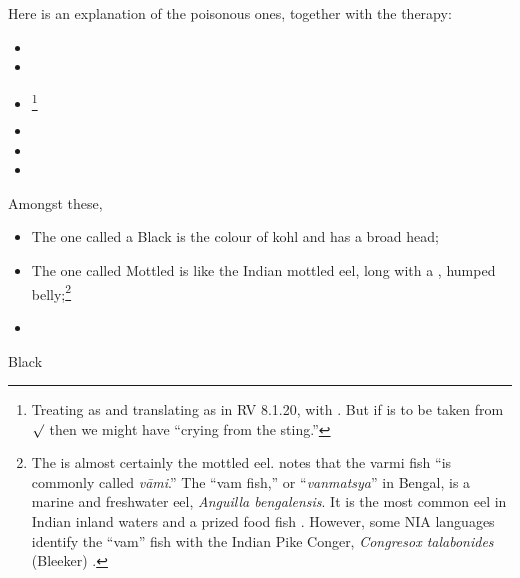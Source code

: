 \begin{translation}
\item[1.13.11]
Here is an explanation of the poisonous ones, together with the therapy:
\begin{itemize}
    \item {}
    \item {}
    \item {}\footnote{Treating  as  
        and translating as in RV 8.1.20, with \citet[1023, verse 20 and cf.\ commentary 
        ]{jami-2014}. But if  is to be taken from $\surd$ then we 
        might have “crying from the sting.”}
    \item {}
    \item {}
    \item {}
\end{itemize}
Amongst these, 
\begin{itemize}
    \item The one called a Black is the colour of kohl and has a broad head;
\item The one called Mottled is like the Indian mottled eel, long with a
, humped belly;\footnote{The 
     is almost certainly the mottled eel.
    \cite[962c]{moni-sans} notes that the varmi fish “is commonly called
    \emph{vāmi}.”  The “vam fish,” or “\emph{vanmatsya}” in Bengal, is a
    marine and freshwater eel, \emph{Anguilla bengalensis}. It is the most
    common eel in Indian inland waters and a prized food fish
    \citep{froe-2022}.  However, some NIA languages identify the “vam” fish
    with the Indian Pike Conger, \emph{Congresox talabonides} (Bleeker)
    \citep[235, 236]{talw-1984}.} 
    
    \item
\end{itemize}Black




    
\end{translation}



